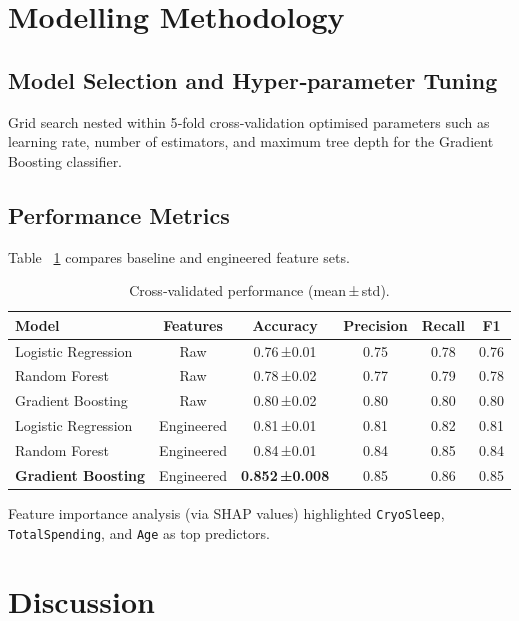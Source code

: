 \documentclass[12pt]{article}
\begin{document}
\section{Modelling Methodology}
\subsection{Model Selection and Hyper‑parameter Tuning}
Grid search nested within 5‑fold cross‑validation optimised parameters such as learning rate, number of estimators, and maximum tree depth for the Gradient Boosting classifier.
\subsection{Performance Metrics}
Table ~\ref{tab:results} compares baseline and engineered feature sets.
\begin{table}[H]
\centering
\caption{Cross‑validated performance (mean\,±\,std).}
\label{tab:results}
\begin{tabular}{@{}lccccc@{}}
\toprule
\textbf{Model} & \textbf{Features} & \textbf{Accuracy} & \textbf{Precision} & \textbf{Recall} & \textbf{F1} \\
\midrule
Logistic Regression & Raw & 0.76\,±0.01 & 0.75 & 0.78 & 0.76 \\
Random Forest       & Raw & 0.78\,±0.02 & 0.77 & 0.79 & 0.78 \\
Gradient Boosting   & Raw & 0.80\,±0.02 & 0.80 & 0.80 & 0.80 \\
Logistic Regression & Engineered & 0.81\,±0.01 & 0.81 & 0.82 & 0.81 \\
Random Forest       & Engineered & 0.84\,±0.01 & 0.84 & 0.85 & 0.84 \\
\textbf{Gradient Boosting} & Engineered & \textbf{0.852\,±0.008} & 0.85 & 0.86 & 0.85 \\
\bottomrule
\end{tabular}
\end{table}

Feature importance analysis (via SHAP values) highlighted \texttt{CryoSleep}, \texttt{TotalSpending}, and \texttt{Age} as top predictors.

\section{Discussion}
\end{document}
